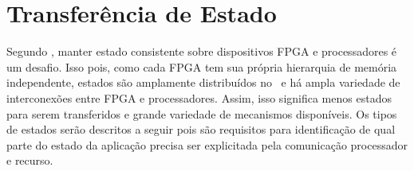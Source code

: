\section{Transferência de Estado} \label{chap:tranferencia}
   Segundo \citeauthor{Sass2010}, manter estado consistente sobre dispositivos FPGA e processadores é um desafio.
   Isso pois, como cada FPGA tem sua própria hierarquia de memória independente, estados são amplamente distribuídos no \design\ e há ampla variedade de interconexões entre FPGA e processadores.
   Assim, isso significa menos estados para serem transferidos e grande variedade de mecanismos disponíveis.
   Os tipos de estados serão descritos a seguir pois são requisitos para identificação de qual parte do estado da aplicação precisa ser explicitada pela comunicação processador e recurso.
   
